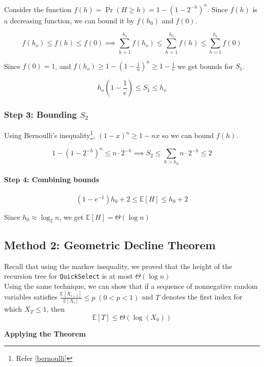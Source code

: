 Consider the function $f(h)=\Pr(H\ge h)=1-(1-2^{-h})^{n}$. Since $f(h)$ is a decreasing function, we can 
bound it by $f(h_0)$ and $f(0)$.

\[
f(h_{o}) \le f(h) \le f(0) 
\implies 
\sum_{h=1}^{h_o}f(h_{o}) \le \sum_{h=1}^{h_o}f(h) \le \sum_{h=1}^{h_o}f(0)
\]

\vspace{0.5em}
Since $f(0)=1$, and $f(h_o) \ge 1-(1-\frac{1}{n})^n \ge 1-\frac{1}{e}$ we get bounds for $S_1$.

\[
h_o(1-\frac{1}{e})\le S_1 \le h_o
\]

\subsubsection*{Step 3: Bounding \(S_2\)}


Using Bernoulli's inequality\footnote{Refer \autoref{bernoulli}}, $(1-x)^{n} \ge 1-nx$ so we can 
bound $f(h)$.

\[
1-(1-2^{-h})^n \le n \cdot 2^{-h}
\implies
S_2 \le \sum_{h>h_0}n \cdot 2^{-h} \le 2
\]

\paragraph{Step 4: Combining bounds}

\[
(1-e^{-1})h_0 + 2\le \mathbb{E}[H] \le h_0 + 2
\]

Since \(h_0 \approx \log_2 n\), we get $\mathbb{E}[H]=\Theta(\log n)$

\subsection*{Method 2: Geometric Decline Theorem}

Recall that using the markov inequality, we proved that the height of the 
recursion tree for \texttt{QuickSelect} is at most \(\Theta(\log n)\) \\

\noindent Using the same technique, we can show that if a 
sequence of nonnegative random variables satisfies $\frac{\mathbb E[X_{i+1}]}{\mathbb E[X_i]} \le p 
\; (0<p<1)$ and \(T\) denotes the first index for which \(X_T \le 1\), then
\[
\mathbb E[T] \le \Theta(\log (X_0))
\]

\vspace{1em}

\noindent \textbf{Applying the Theorem}\\

